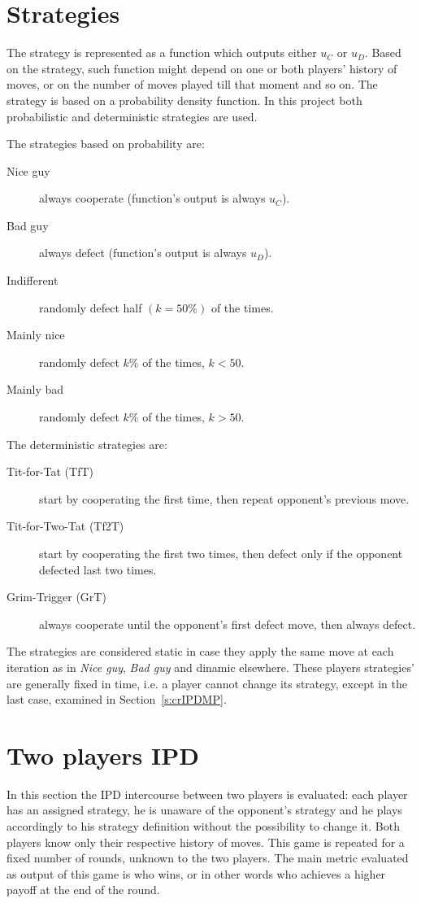 \documentclass[journal,a4paper,10pt,twoside]{IEEEtran} %
\begin{document}
\section{Strategies} \label{s:str}
The strategy is represented as a function which outputs either $u_C$ or $u_D$. Based on the strategy, such function might depend on one or both players' history of moves, or on the number of moves played till that moment and so on.
The strategy is based on a probability density function. In this project both probabilistic and deterministic strategies are used.

The strategies based on probability are:

\begin{description}
    \item[Nice guy] always cooperate (function's output is always $u_C$).
    \item[Bad guy] always defect (function's output is always $u_D$).
    \item[Indifferent] randomly defect half $(k=50\%)$ of the times.
    \item[Mainly nice] randomly defect $k\%$ of the times, $k<50$.%
    \item[Mainly bad] randomly defect $k\%$ of the times, $k>50$.%
\end{description}

The deterministic strategies are:
\begin{description}
    \item[Tit-for-Tat (TfT)] start by cooperating the first time, then repeat opponent's previous move.
    \item[Tit-for-Two-Tat (Tf2T)] start by cooperating the first two times, then defect only if the opponent defected last two times.
    \item[Grim-Trigger (GrT)] always cooperate until the opponent's first defect move, then always defect. 
\end{description}

The strategies are considered static in case they apply the same move at each iteration as in \textit{Nice guy}, \textit{Bad guy} and dinamic elsewhere.
These players strategies' are generally fixed in time, i.e. a player cannot change its strategy, except in the last case, examined in Section~\ref{s:crIPDMP}.

\section{Two players IPD} \label{s:IPD2P}
In this section the IPD intercourse between two players is evaluated: each player has an assigned strategy, he is unaware of the opponent's strategy and he plays accordingly to his strategy definition without the possibility to change it. Both players know only their respective history of moves. This game is repeated for a fixed number of rounds, unknown to the two players. The main metric evaluated as output of this game is who wins, or in other words who achieves a higher payoff at the end of the round.
\end{document}
